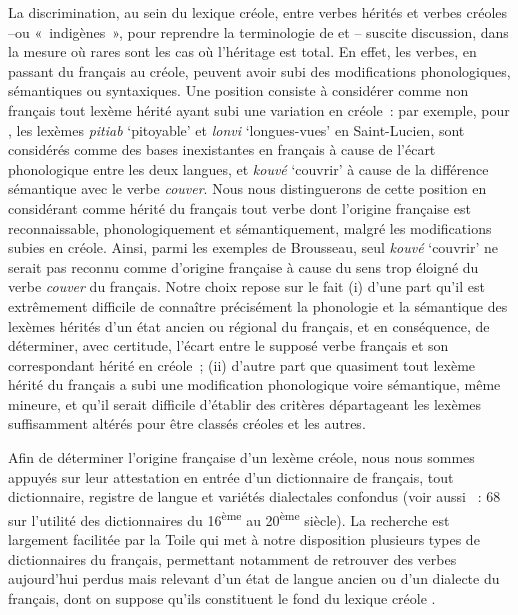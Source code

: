 \documentclass[output=paper]{langsci/langscibook}
\begin{document}
La discrimination, au sein du lexique créole, entre verbes hérités et
verbes créoles --ou «~indigènes~», pour reprendre la terminologie de
%
\citet{Lefebvre2003} %
%
et %
\citet{Brousseau11}%
%
-- suscite discussion, dans la mesure
où rares sont les cas où l'héritage est total. En effet, les verbes, en
passant du français au créole, peuvent avoir subi des modifications
phonologiques, sémantiques ou syntaxiques. Une position consiste à
considérer comme non français tout lexème hérité ayant subi une
variation en créole~: par exemple, pour %
\citet[68]{Brousseau11}%
%
, les
lexèmes \emph{pitiab} `pitoyable' et \emph{lonvi} `longues-vues' en
Saint-Lucien, sont considérés comme des bases inexistantes en français à
cause de l'écart phonologique entre les deux langues, et \emph{kouvé}
`couvrir' à cause de la différence sémantique avec le verbe
\emph{couver}. Nous nous distinguerons de cette position en considérant
comme hérité du français tout verbe dont l'origine française est
reconnaissable, phonologiquement et sémantiquement, malgré les
modifications subies en créole. Ainsi, parmi les exemples de Brousseau,
seul \emph{kouvé} `couvrir' ne serait pas reconnu comme d'origine
française à cause du sens trop éloigné du verbe \emph{couver} du
français. Notre choix repose sur le fait (i) d'une part qu'il est
extrêmement difficile de connaître précisément la phonologie et la
sémantique des lexèmes hérités d'un état ancien ou régional du français,
et en conséquence, de déterminer, avec certitude, l'écart entre le
supposé verbe français et son correspondant hérité en créole~; (ii)
d'autre part que quasiment tout lexème hérité du français a subi une
modification phonologique voire sémantique, même mineure, et qu'il
serait difficile d'établir des critères départageant les lexèmes
suffisamment altérés pour être classés créoles et les autres.

Afin de déterminer l'origine française d'un lexème créole, nous nous
sommes appuyés sur leur attestation en entrée d'un dictionnaire de
français, tout dictionnaire, registre de langue et variétés dialectales
confondus %
(voir aussi %
\citealt{Brousseau11}%
~: 68 sur l'utilité des dictionnaires du 16\textsuperscript{ème} au 20\textsuperscript{ème} siècle).
%
La recherche est largement facilitée par la Toile qui met à
notre disposition plusieurs types de dictionnaires du français,
permettant notamment de retrouver des verbes aujourd'hui perdus mais
relevant d'un état de langue ancien ou d'un dialecte du français, dont
on suppose qu'ils constituent le fond du lexique créole 
\citep[cf. par exemple][12]{Thibault12}%
.
\end{document}
